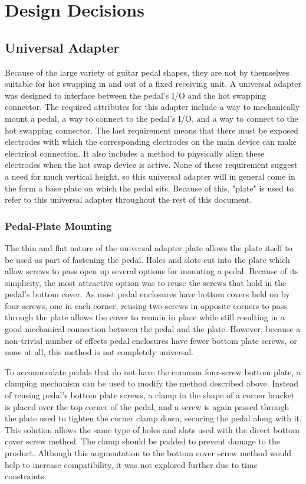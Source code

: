 \section{Design Decisions}
	\subsection{Universal Adapter}

	Because of the large variety of guitar pedal shapes, they are not by themselves suitable for hot swapping in and out of a fixed receiving unit. A universal adapter was designed to interface between the pedal's I/O and the hot swapping connector.  The required attributes for this adapter include a way to mechanically mount a pedal, a way to connect to the pedal's I/O, and a way to connect to the hot swapping connector.  The last requirement means that there must be exposed electrodes with which the corresponding electrodes on the main device can make electrical connection.  It also includes a method to physically align these electrodes when the hot swap device is active.  None of these requirement suggest a need for much vertical height, so this universal adapter will in general come in the form a base plate on which the pedal sits.  Because of this, "plate" is used to refer to this universal adapter throughout the rest of this document.  

		\subsubsection{Pedal-Plate Mounting}

		The thin and flat nature of the universal adapter plate allows the plate itself to be used as part of fastening the pedal.  Holes and slots cut into the plate which allow screws to pass open up several options for mounting a pedal.  Because of its simplicity, the most attractive option was to reuse the screws that hold in the pedal's bottom cover.  As most pedal enclosures have bottom covers held on by four screws, one in each corner, reusing two screws in opposite corners to pass through the plate allows the cover to remain in place while still resulting in a good mechanical connection between the pedal and the plate.  However, because a non-trivial number of effects pedal enclosures have fewer bottom plate screws, or none at all, this method is not completely universal.

		To accommodate pedals that do not have the common four-screw bottom plate, a clamping mechanism can be used to modify the method described above.  Instead of reusing pedal's bottom plate screws, a clamp in the shape of a corner bracket is placed over the top corner of the pedal, and a screw is again passed through the plate used to tighten the corner clamp down, securing the pedal along with it.  This solution allows the same type of holes and slots used with the direct bottom cover screw method.  The clamp should be padded to prevent damage to the product.  Although this augmentation to the bottom cover screw method would help to increase compatibility, it was not explored further due to time constraints.

